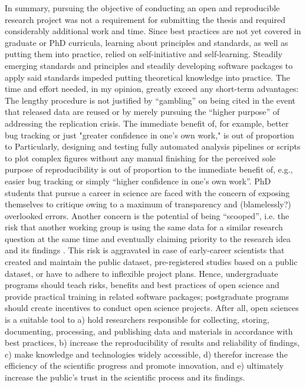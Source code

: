 %
In summary, pursuing the objective of conducting an open and reproducible
research project was not a requirement for submitting the thesis and required
considerably additional work and time.
%
Since best practices are not yet covered in graduate or PhD curricula, learning
about principles and standards, as well as putting them into practice, relied on
self-initiative and self-learning.
%
Steadily emerging standards and principles and steadily developing software
packages to apply said standards impeded putting theoretical knowledge into
practice.
%
The time and effort needed, in my opinion, greatly exceed any short-term
advantages:
%
The lengthy procedure is not justified by ``gambling'' on being cited in the
event that released data are reused or by merely pursuing the ``higher purpose''
of addressing the replication crisis.
%
The immediate benefit of, for example, better bug tracking or just "greater
confidence in one's own work," is out of proportion to
%
Particularly, designing and testing fully automated analysis pipelines or
scripts to plot complex figures without any manual finishing for the perceived
sole purpose of reproducibility is out of proportion to the immediate benefit
of, e.g., easier bug tracking or simply ``higher confidence in one's own work''.
%
PhD students that pursue a career in science are faced with the concern of
exposing themselves to critique owing to a maximum of transparency and
(blamelessly?) overlooked errors.
%
Another concern is the potential of being ``scooped'', i.e. the risk that
another working group is using the same data for a similar research question at
the same time and eventually claiming priority to the research idea and its
findings \citep[cf.][]{laine2017afraid}.
%
This risk is aggravated in case of early-career scientists that created and
maintain the public dataset, pre-registered studies based on a public dataset,
or have to adhere to inflexible project plans.
%
Hence, undergraduate programs should teach risks, benefits and best practices of
open science and provide practical training in related software packages;
%
postgraduate programs should create incentives to conduct open science projects.
%
After all, open sciences is a suitable tool to
%
a) hold researchers responsible for collecting, storing, documenting,
processing, and publishing data and materials in accordance with best practices,
%
b) increase the reproducibility of results and reliability of findings,
%
c) make knowledge and technologies widely accessible,
%
d) therefor increase the efficiency of the scientific progress and promote
innovation, and
%
e) ultimately increase the public's trust in the scientific process and its
findings.

